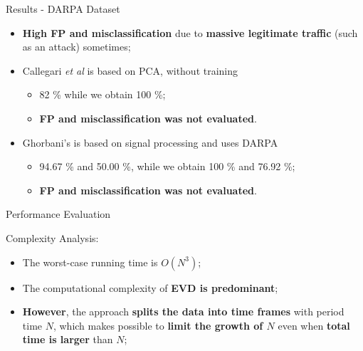 \documentclass[newPxFont, numfooter, sectionpages]{beamer}
\begin{document}
\begin{frame}{Results - DARPA Dataset}
	
	\begin{itemize}
		\item \textbf{High FP and misclassification} due to \textbf{massive legitimate traffic} (such as an attack) sometimes;
		\item Callegari \emph{et al} is based on PCA, without training
		\begin{itemize}
			\item 82 \% while we obtain 100 \%;
			\item \textbf{FP and misclassification was not evaluated}.
		\end{itemize}
		\item Ghorbani's is based on signal processing and uses DARPA
		\begin{itemize}
			\item 94.67 \% and 50.00 \%, while we obtain 100 \% and 76.92 \%;
			\item \textbf{FP and misclassification was not evaluated}.
		\end{itemize}
	\end{itemize}
\end{frame}
\begin{frame}{Performance Evaluation}

	Complexity Analysis:
	\begin{itemize}
		\item The worst-case running time is $O(N^3)$;
		\item The computational complexity of \textbf{EVD is predominant};
		\item \textbf{However}, the approach \textbf{splits the data into time frames} with period time $N$, which makes possible to \textbf{limit the growth of $N$} even when \textbf{total time is larger} than $N$;		
	\end{itemize}
	
\end{frame}
	
\end{document}
